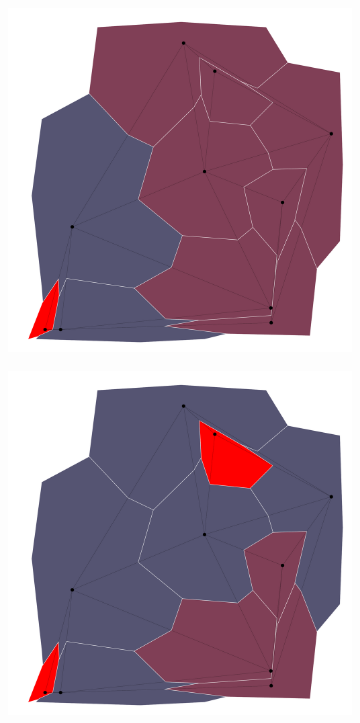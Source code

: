 \documentclass{article}
\begin{document}
		\begin{figure}[h!]
			\begin{subfigure}{0.18\textwidth}
				\centering
				\includegraphics[width=\textwidth]{images/sequences/mac_backtracking/bt_mac_I00003}
				\caption{}
			\end{subfigure}
			\;
			\begin{subfigure}{0.18\textwidth}
				\centering
				\includegraphics[width=\textwidth]{images/sequences/mac_backtracking/bt_mac_I00004}

\end{subfigure}
\end{figure}
\end{document}
